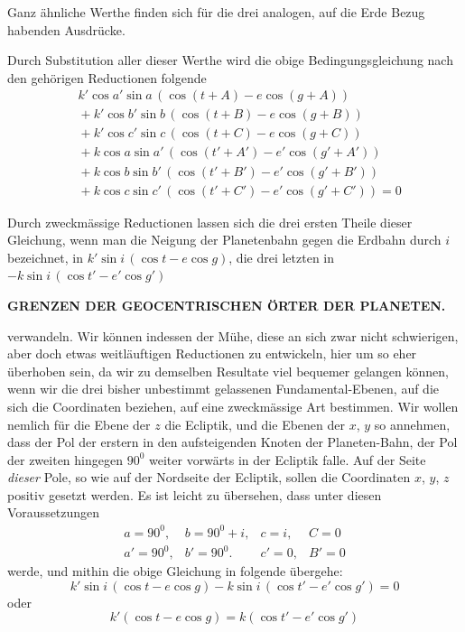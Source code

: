 Ganz ähnliche Werthe finden sich für die drei analogen, auf die Erde Bezug habenden
Ausdrücke.

Durch Substitution aller dieser Werthe wird die obige Bedingungsgleichung
nach den gehörigen Reductionen folgende
\[
\begin{aligned}
&k'\cos a'\sin a\,(\cos(t+A)-e\cos(g+A))\\
&{}+k'\cos b'\sin b\,(\cos(t+B)-e\cos(g+B))\\
&{}+k'\cos c'\sin c\,(\cos(t+C)-e\cos(g+C))\\
&{}+k\cos a\sin a'\,(\cos(t'+A')-e'\cos(g'+A'))\\
&{}+k\cos b\sin b'\,(\cos(t'+B')-e'\cos(g'+B'))\\
&{}+k\cos c\sin c'\,(\cos(t'+C')-e'\cos(g'+C'))=0
\end{aligned}
\]

Durch zweckmässige Reductionen lassen sich die drei ersten Theile dieser
Gleichung, wenn man die Neigung der Planetenbahn gegen die Erdbahn durch
$i$ bezeichnet, in $k'\sin i\,(\cos t-e\cos g)$, die drei letzten in $-k\sin i\,(\cos t'-e'\cos g')$
\par\clearpage
\noindent{}%
\makebox[12mm][l]{}%
\parbox[t]{\dimexpr\linewidth-24mm\relax}{\centering\fontsize{7.4}{9.2}\selectfont\bfseries GRENZEN DER GEOCENTRISCHEN ÖRTER DER PLANETEN.\par}%
\par\nobreak\smallskip
\noindent verwandeln. Wir können indessen der Mühe, diese an sich zwar nicht schwierigen,
aber doch etwas weitläuftigen Reductionen zu entwickeln, hier um so eher
überhoben sein, da wir zu demselben Resultate viel bequemer gelangen können,
wenn wir die drei bisher unbestimmt gelassenen Fundamental-Ebenen, auf die
sich die Coordinaten beziehen, auf eine zweckmässige Art bestimmen. Wir wollen
nemlich für die Ebene der $z$ die Ecliptik, und die Ebenen der $x$, $y$ so annehmen,
dass der Pol der erstern in den aufsteigenden Knoten der Planeten-Bahn,
der Pol der zweiten hingegen $90^0$ weiter vorwärts in der Ecliptik falle.
Auf der Seite \textit{dieser} Pole, so wie auf der Nordseite der Ecliptik, sollen die Coordinaten
$x$, $y$, $z$ positiv gesetzt werden. Es ist leicht zu übersehen, dass unter
diesen Voraussetzungen
\[
\begin{array}{llll}
a=90^0,&b=90^0+i,&c=i,&C=0\\
a'=90^0,&b'=90^0.&c'=0,&B'=0
\end{array}
\]
werde, und mithin die obige Gleichung in folgende übergehe:
\[
k'\sin i\,(\cos t-e\cos g)-k\sin i\,(\cos t'-e'\cos g')=0
\]
oder
\[
k'(\cos t-e\cos g)=k(\cos t'-e'\cos g')
\]

